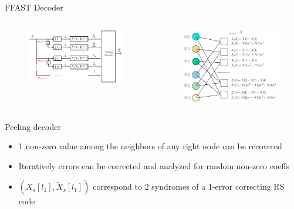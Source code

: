 \documentclass[10pt,xcolor=table]{beamer}
\begin{document}
	\begin{frame}{FFAST Decoder}
		
		
	\begin{columns}
			\begin{figure}[t]
				\centering
				\includegraphics[width=2.5in]{./Figures/FFAST_2stages}
			\end{figure}
			\vspace{-6mm}
			\hspace{-1.5in}
			
			\begin{figure}[t]
				
				\includegraphics[width=2.45in]{./Figures/Factorgraph_example_tilde}
			\end{figure}
			
		\end{columns}
		\begin{block}{Peeling decoder}
			\begin{itemize}
				\item 1 non-zero value among the neighbors of any right node can be recovered
				\item Iteratively errors can be corrected and analyzed for random non-zero coeffs
				\pause
				\item $(X_s[l_1],\tilde{X}_s[l_1])$ correspond to 2 syndromes of a 1-error correcting RS code
			\end{itemize}
		\end{block}
	\end{frame}	
\end{document}
